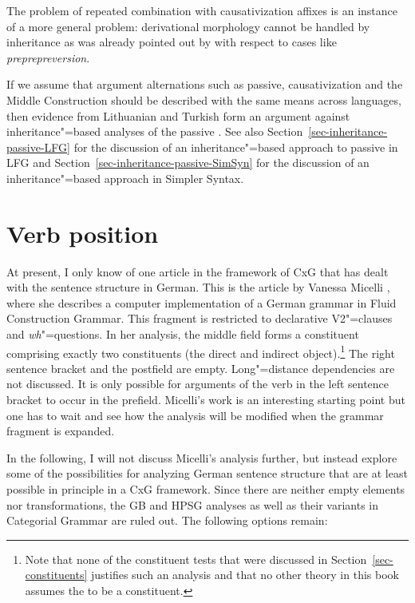 The problem of repeated combination with causativization affixes is an instance of a more general
problem: derivational morphology cannot be handled by inheritance as was already pointed out by
\citet{KN93a} with respect to cases like \emph{preprepreversion}.

If we assume that argument alternations such as passive, causativization and the Middle Construction should be described with the same means
across languages, then evidence from Lithuanian and Turkish form an argument against
inheritance"=based analyses of the passive \citep{Mueller2006d,Mueller2007d,MWArgSt}. See also
Section~\ref{sec-inheritance-passive-LFG} for the discussion of an inheritance"=based approach to passive in LFG and Section~\ref{sec-inheritance-passive-SimSyn}
for the discussion of an inheritance"=based approach in Simpler Syntax.

\section{Verb position}

At present, I only know of one article in the framework of CxG that has dealt with the sentence structure
in German. This is the article by Vanessa Micelli
\citeyearpar{Micelli2012a}, where she describes a computer implementation of a German grammar in Fluid Construction Grammar\indexfcg.
This fragment is restricted to declarative V2"=clauses and \emph{wh}"=questions. In her analysis, the middle field forms a constituent
comprising exactly two constituents (the direct and indirect object).\footnote{%
  Note that none of the constituent tests that were discussed in Section~\ref{sec-constituents}
  justifies such an analysis and that no other theory in this book assumes the \mf to be a constituent.%
} The right sentence bracket and the postfield are empty.
Long"=distance dependencies are not discussed. It is only possible for arguments of the verb in the left sentence bracket to occur
in the prefield. Micelli's work is an interesting starting point but one has to wait and see how the analysis will be  modified when
the grammar fragment is expanded.

\largerpage
In the following, I will not discuss Micelli's analysis further, but instead explore some of the possibilities for analyzing German sentence
structure that are at least possible in principle in a CxG framework. Since there are neither empty elements nor transformations, the GB and HPSG analyses
as well as their variants in Categorial Grammar are ruled out.
The following options remain:

